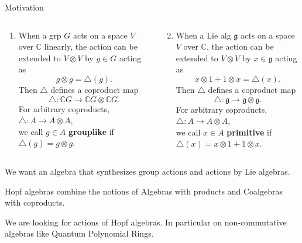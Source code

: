 \documentclass{beamer}
\newcommand\1{_{(1)}}
\newcommand\2{_{(2)}}
\begin{document}
\begin{frame}{Motivation}
\begin{columns}[T]
\begin{column}{0.6\textwidth}
\begin{enumerate}\setlength{\itemindent}{-2ex}
    \item<1-> When a grp $G$ acts on a space $V$ over $\mathbb{C}$ linearly, the action can be extended to $V\otimes V$ by $g\in G$ acting as \[g\otimes g=\triangle(g).\] 
     Then $\triangle$ defines a coproduct map \[\triangle:\mathbb{C}G\to\mathbb{C}G\otimes\mathbb{C}G.\]
     For arbitrary coproducts, $\triangle:A\to A\otimes A$, \\we call $g\in A$ \textbf{grouplike} if $\triangle(g)=g\otimes g$.
\end{enumerate}
\end{column}\hspace{-2ex}\vrule\begin{column}{0.58\textwidth}
\begin{enumerate}
    \setcounter{enumi}{1}
     \item<2-> When a Lie alg $\mathfrak{g}$ acts on a space $V$ over $\mathbb{C}$, the action can be extended to $V\otimes V$ by $x\in\mathfrak{g}$ acting as \[x\otimes 1+1\otimes x=\triangle(x).\]
      Then $\triangle$ defines a coproduct map \[\triangle:\mathfrak{g}\to\mathfrak{g}\otimes\mathfrak{g}.\]
      For arbitrary coproducts, $\triangle:A\to A\otimes A$,\\ we call $x\in A$ \textbf{primitive} if $\triangle(x)=x\otimes 1+1\otimes x$.
\end{enumerate}
\end{column}
\end{columns}
\vspace{0.5cm}
\end{frame}

\begin{frame}{}
    \begin{beamerboxesrounded}{}{}
        \begin{center}
            We want an algebra that synthesizes group actions and actions by Lie algebras.
        \end{center}
    \end{beamerboxesrounded}
    \begin{beamerboxesrounded}{}{}
        \begin{center}
    Hopf algebras combine the notions of Algebras with products and Coalgebras with coproducts.
        \end{center}
    \begin{center}We are looking for actions of Hopf algebras.
    In particular on non-commutative algebras like Quantum Polynomial Rings.    
        \end{center}       
    \end{beamerboxesrounded}
\end{frame}
\end{document}
